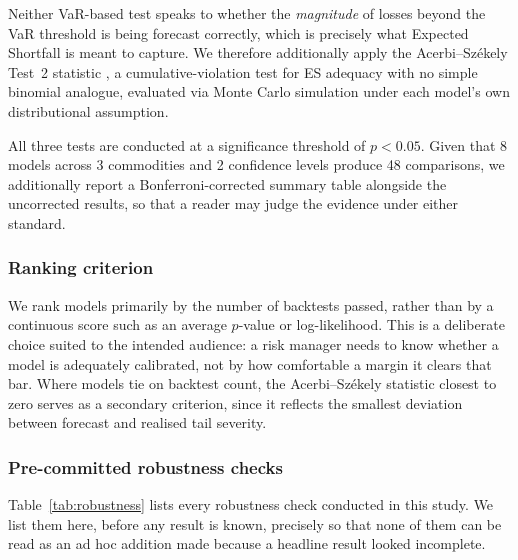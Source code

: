 \documentclass[preprint,12pt,authoryear]{elsarticle}
\begin{document}
Neither VaR-based test speaks to whether the \emph{magnitude} of losses beyond the VaR threshold is being forecast correctly, which is precisely what Expected Shortfall is meant to capture. We therefore additionally apply the Acerbi--Székely Test~2 statistic \citep{acerbiszekely2014}, a cumulative-violation test for ES adequacy with no simple binomial analogue, evaluated via Monte Carlo simulation under each model's own distributional assumption.

All three tests are conducted at a significance threshold of $p < 0.05$. Given that 8 models across 3 commodities and 2 confidence levels produce 48 comparisons, we additionally report a Bonferroni-corrected summary table alongside the uncorrected results, so that a reader may judge the evidence under either standard.

\subsubsection{Ranking criterion}

We rank models primarily by the number of backtests passed, rather than by a continuous score such as an average $p$-value or log-likelihood. This is a deliberate choice suited to the intended audience: a risk manager needs to know whether a model is adequately calibrated, not by how comfortable a margin it clears that bar. Where models tie on backtest count, the Acerbi--Székely statistic closest to zero serves as a secondary criterion, since it reflects the smallest deviation between forecast and realised tail severity.

\subsubsection{Pre-committed robustness checks}

Table~\ref{tab:robustness} lists every robustness check conducted in this study. We list them here, before any result is known, precisely so that none of them can be read as an ad hoc addition made because a headline result looked incomplete.
\end{document}
